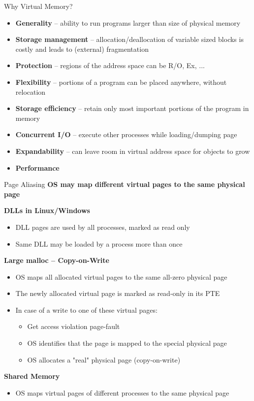 \documentclass[aspectratio=169,12pt]{beamer}
\begin{document}
\begin{frame}{Why Virtual Memory?}
\begin{itemize}
\item \textbf{Generality} – ability to run programs larger than size of physical memory
\item \textbf{Storage management} – allocation/deallocation of variable sized blocks is costly and leads to (external) fragmentation
\item \textbf{Protection} – regions of the address space can be R/O, Ex, ...
\item \textbf{Flexibility} – portions of a program can be placed anywhere, without relocation
\item \textbf{Storage efficiency} – retain only most important portions of the program in memory
\item \textbf{Concurrent I/O} – execute other processes while loading/dumping page
\item \textbf{Expandability} – can leave room in virtual address space for objects to grow
\item \textbf{Performance}
\end{itemize}
\end{frame}

\begin{frame}{Page Aliasing}
\textbf{OS may map different virtual pages to the same physical page}

\textbf{DLLs in Linux/Windows}
\begin{itemize}
\item DLL pages are used by all processes, marked as read only
\item Same DLL may be loaded by a process more than once
\end{itemize}

\textbf{Large malloc – Copy-on-Write}
\begin{itemize}
\item OS maps all allocated virtual pages to the same all-zero physical page
\item The newly allocated virtual page is marked as read-only in its PTE
\item In case of a write to one of these virtual pages:
    \begin{itemize}
    \item Get access violation page-fault
    \item OS identifies that the page is mapped to the special physical page
    \item OS allocates a "real" physical page (copy-on-write)
    \end{itemize}
\end{itemize}

\textbf{Shared Memory}
\begin{itemize}
\item OS maps virtual pages of different processes to the same physical page
\end{itemize}
\end{frame}
\end{document}

